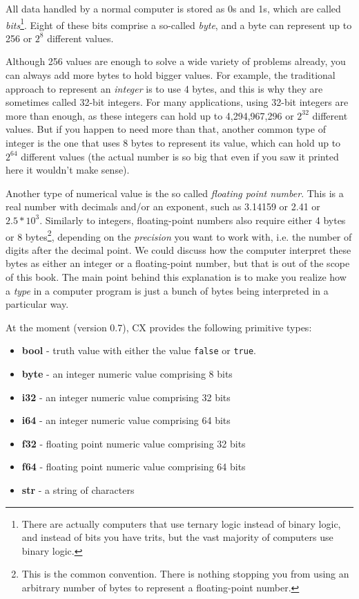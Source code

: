 \documentclass[11pt,fleqn,openany]{book} %
\begin{document}
All data handled by a normal computer is stored as 0s and 1s, which are called \emph{bits}\footnote{There are actually computers that use ternary logic instead of binary logic, and instead of bits you have trits, but the vast majority of computers use binary logic.}. Eight of these bits comprise a so-called \emph{byte}, and a byte can represent up to 256 or $2^8$ different values. 

Although 256 values are enough to solve a wide variety of problems already, you can always add more bytes to hold bigger values. For example, the traditional approach to represent an \emph{integer} is to use 4 bytes, and this is why they are sometimes called 32-bit integers. For many applications, using 32-bit integers are more than enough, as these integers can hold up to 4,294,967,296 or $2^{32}$ different values. But if you happen to need more than that, another common type of integer is the one that uses 8 bytes to represent its value, which can hold up to $2^{64}$ different values (the actual number is so big that even if you saw it printed here it wouldn't make sense).

Another type of numerical value is the so called \emph{floating point number}. This is a real number with decimals and/or an exponent, such as 3.14159 or 2.41 or $2.5 * 10^3$. Similarly to integers, floating-point numbers also require either 4 bytes or 8 bytes\footnote{This is the common convention. There is nothing stopping you from using an arbitrary number of bytes to represent a floating-point number.}, depending on the \emph{precision} you want to work with, i.e. the number of digits after the decimal point. We could discuss how the computer interpret these bytes as either an integer or a floating-point number, but that is out of the scope of this book. The main point behind this explanation is to make you realize how a \emph{type} in a computer program is just a bunch of bytes being interpreted in a particular way.

At the moment (version 0.7), CX provides the following primitive types:
\begin{itemize}
    \item \textbf{bool} - truth value with either the value \texttt{false} or \texttt{true}.
    \item \textbf{byte} - an integer numeric value comprising 8 bits
    \item \textbf{i32} - an integer numeric value comprising 32 bits
    \item \textbf{i64} - an integer numeric value comprising 64 bits
    \item \textbf{f32} - floating point numeric value comprising 32 bits
    \item \textbf{f64} - floating point numeric value comprising 64 bits
    \item \textbf{str} - a string of characters
\end{itemize}
\end{document}
